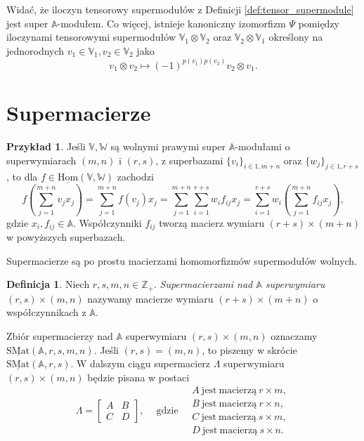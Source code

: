 \documentclass[11pt,a4paper]{report}
\theoremstyle{definition}
\newtheorem{example}[theorem]{Przykład}
\newtheorem{definition}[theorem]{Definicja}
\begin{document}
Widać, że iloczyn tensorowy supermodułów z Definicji \ref{def:tensor_supermodule} jest super $\mathbb{A}$-modułem. Co więcej, istnieje kanoniczny izomorfizm $\Psi$ pomiędzy iloczynami tensorowymi supermodułów $\mathbb{V}_1 \otimes \mathbb{V}_2$ oraz $\mathbb{V}_2 \otimes \mathbb{V}_1$ określony na jednorodnych $v_1 \in \mathbb{V}_1, v_2 \in \mathbb{V}_2$ jako
\begin{equation*}
  v_1 \otimes v_2 \mapsto (-1)^{p(v_1)p(v_2)} v_2 \otimes v_1.
\end{equation*}

\section{Supermacierze}

\begin{example}
\label{ex:supermatrix_motivation}
 Jeśli $\mathbb{V},\mathbb{W}$ są wolnymi prawymi super $\mathbb{A}$-modułami o superwymiarach $(m,n)$ i $(r,s)$, z superbazami $\{ v_i \}_{i \in \overline{1,m+n}}$ oraz $\{ w_j \}_{j\in \overline{1,r+s}}$, to dla $f \in \underline{\mathrm{Hom}}(\mathbb{V},\mathbb{W})$ zachodzi
 \begin{equation}
  f\left( \sum_{j=1}^{m+n} v_j x_j \right) = \sum_{j=1}^{m+n} f(v_j) x_j = \sum_{j=1}^{m+n} \sum_{i=1}^{r+s} w_i f_{ij} x_j = \sum_{i=1}^{r+s} w_i \left( \sum_{j=1}^{m+n} f_{ij} x_j \right),
  \label{eq:free_supermodule_homomorphism}
 \end{equation}
  gdzie $x_i, f_{ij} \in \mathbb{A}$. Współczynniki $f_{ij}$ tworzą macierz wymiaru $(r+s) \times (m+n)$ w powyższych superbazach.
\end{example}

Supermacierze są po prostu macierzami homomorfizmów supermodułów wolnych.

\begin{definition}
Niech $r,s,m,n \in \mathbb{Z}_+$. \textit{Supermacierzami nad $\mathbb{A}$ superwymiaru $(r,s)\times(m,n)$} nazywamy macierze wymiaru $(r+s)\times(m+n)$ o współczynnikach z $\mathbb{A}$.
\end{definition}

Zbiór supermacierzy nad $\mathbb{A}$ superwymiaru $(r,s)\times(m,n)$ oznaczamy $\underline{\mathrm{SMat}}(\mathbb{A},r,s,m,n).$ Jeśli $(r,s)=(m,n)$, to piszemy w skrócie $\underline{\mathrm{SMat}}(\mathbb{A},r,s).$ W dalszym ciągu supermacierz $\Lambda$ superwymiaru $(r,s)\times(m,n)$ będzie pisana w postaci
\begin{equation}
\label{eq:supermatrix_shape}
 \Lambda=\begin{bmatrix}
      A & B \\
      C & D
     \end{bmatrix}\!\!, \quad \ \mathrm{gdzie} \quad 
     \begin{array}{l}
      A \mathrm{\ jest\ macierzą\ } r \times m, \\
      B \mathrm{\ jest\ macierzą\ } r \times n, \\
      C \mathrm{\ jest\ macierzą\ } s \times m, \\
      D \mathrm{\ jest\ macierzą\ } s \times n.
     \end{array}
\end{equation}
\end{document}
